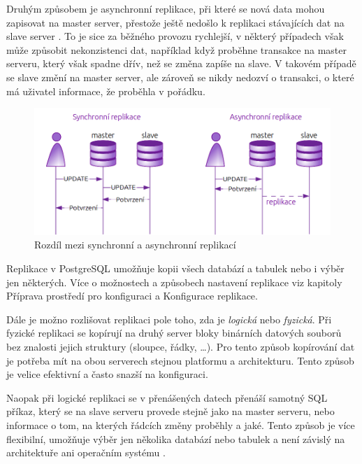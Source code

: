 Druhým způsobem je asynchronní replikace, při které se nová data mohou zapisovat na master server, přestože ještě nedošlo k replikaci stávajících dat na slave server \citep{ObeHsu2012}. To je sice za běžného provozu rychlejší, v některý případech však může způsobit nekonzistenci dat, například když proběhne transakce na master serveru, který však spadne dřív, než se změna zapíše na slave. V takovém případě se slave změní na master server, ale zároveň se nikdy nedozví o transakci, o které má uživatel informace, že proběhla v pořádku. 

        \begin{figure}[H]
          \centering
          \includegraphics[scale=1]{../../../grafy/obr/schema_asyncSync.png}
          \caption {Rozdíl mezi synchronní a asynchronní replikací}
        \end{figure}
Replikace v PostgreSQL umožňuje kopii všech databází a tabulek nebo i výběr jen některých. Více o možnostech a způsobech nastavení replikace viz kapitoly  Příprava prostředí pro konfiguraci a  Konfigurace replikace.

Dále je možno rozlišovat replikaci pole toho, zda je {\it logická} nebo {\it fyzická}. Při fyzické replikaci se kopírují na druhý server bloky binárních datových souborů bez znalosti jejich struktury (sloupce, řádky, …). Pro tento způsob kopírování dat je potřeba mít na obou serverech stejnou platformu a architekturu. Tento způsob je velice efektivní a často snazší na konfiguraci. 

Naopak při logické replikaci se v přenášených datech přenáší samotný SQL příkaz, který se na slave serveru provede stejně jako na master serveru, nebo informace o tom, na kterých řádcích změny proběhly a jaké. Tento způsob je více flexibilní, umožňuje výběr jen několika databází nebo tabulek a není závislý na architektuře ani operačním systému \citep{Boszormenyi2013}. 

